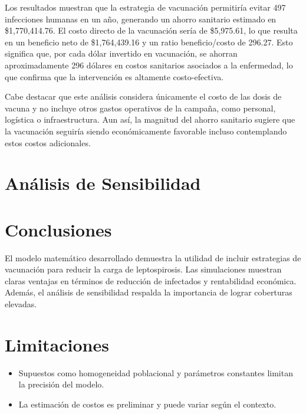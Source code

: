 \documentclass[12pt,a4paper]{article}
\begin{document}
Los resultados muestran que la estrategia de vacunación permitiría evitar 497 infecciones humanas en un año, generando un ahorro sanitario estimado en \$1,770,414.76. El costo directo de la vacunación sería de \$5,975.61, lo que resulta en un beneficio neto de \$1,764,439.16 y un ratio beneficio/costo de 296.27. Esto significa que, por cada dólar invertido en vacunación, se ahorran aproximadamente 296 dólares en costos sanitarios asociados a la enfermedad, lo que confirma que la intervención es altamente costo-efectiva.

Cabe destacar que este análisis considera únicamente el costo de las dosis de vacuna y no incluye otros gastos operativos de la campaña, como personal, logística o infraestructura. Aun así, la magnitud del ahorro sanitario sugiere que la vacunación seguiría siendo económicamente favorable incluso contemplando estos costos adicionales.

\newpage

\section{Análisis de Sensibilidad}

\newpage
\section{Conclusiones}

El modelo matemático desarrollado demuestra la utilidad de incluir estrategias de vacunación para reducir la carga de leptospirosis. Las simulaciones muestran claras ventajas en términos de reducción de infectados y rentabilidad económica. Además, el análisis de sensibilidad respalda la importancia de lograr coberturas elevadas.

\section{Limitaciones}

\begin{itemize}
\item Supuestos como homogeneidad poblacional y parámetros constantes limitan la precisión del modelo.
\item La estimación de costos es preliminar y puede variar según el contexto.
\end{itemize}

\newpage
\end{document}
